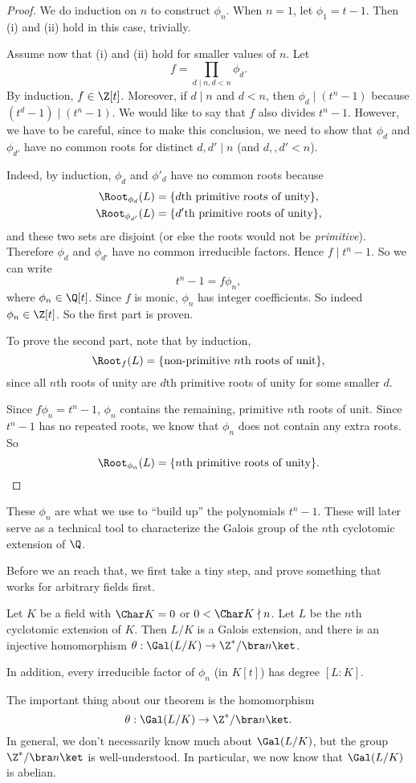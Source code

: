 \documentclass[a4paper]{article}
\begin{document}
\begin{proof}
  We do induction on $n$ to construct $\phi_n$. When $n = 1$, let $\phi_1 = t - 1$. Then (i) and (ii) hold in this case, trivially.

  Assume now that (i) and (ii) hold for smaller values of $n$. Let
  \[
    f = \prod_{d \mid n, d < n} \phi_d.
  \]
  By induction, $f \in \Z[t]$. Moreover, if $d \mid n$ and $d < n$, then $\phi_d \mid (t^n - 1)$ because $(t^d - 1) \mid (t^n - 1)$. We would like to say that $f$ also divides $t^n - 1$. However, we have to be careful, since to make this conclusion, we need to show that $\phi_d$ and $\phi_{d'}$ have no common roots for distinct $d, d' \mid n$ (and $d, ,d' < n$).

  Indeed, by induction, $\phi_d$ and $\phi'_d$ have no common roots because
  \begin{align*}
    \Root_{\phi_d}(L) &= \{d\text{th primitive roots of unity}\},\\
    \Root_{\phi_{d'}}(L) &= \{d'\text{th primitive roots of unity}\},
  \end{align*}
  and these two sets are disjoint (or else the roots would not be \emph{primitive}). Therefore $\phi_d$ and $\phi_{d'}$ have no common irreducible factors. Hence $f \mid t^n - 1$. So we can write
  \[
    t^n - 1 = f \phi_n,
  \]
  where $\phi_n \in \Q[t]$. Since $f$ is monic, $\phi_n$ has integer coefficients. So indeed $\phi_n \in \Z[t]$. So the first part is proven.

  To prove the second part, note that by induction,
  \[
    \Root_f(L) = \{\text{non-primitive }n\text{th roots of unit}\},
  \]
  since all $n$th roots of unity are $d$th primitive roots of unity for some smaller $d$.

  Since $f \phi_n = t^n - 1$, $\phi_n$ contains the remaining, primitive $n$th roots of unit. Since $t^n - 1$ has no repeated roots, we know that $\phi_n$ does not contain any extra roots. So
  \[
    \Root_{\phi_n}(L) = \{n\text{th primitive roots of unity}\}.
  \]
\end{proof}
These $\phi_n$ are what we use to ``build up'' the polynomials $t^n - 1$. These will later serve as a technical tool to characterize the Galois group of the $n$th cyclotomic extension of $\Q$.

Before we an reach that, we first take a tiny step, and prove something that works for arbitrary fields first.

\begin{thm}
  Let $K$ be a field with $\Char K = 0$ or $0 < \Char K \nmid n$. Let $L$ be the $n$th cyclotomic extension of $K$. Then $L/K$ is a Galois extension, and there is an injective homomorphism $\theta: \Gal(L/K) \to \Z^*/\bra n\ket$.

  In addition, every irreducible factor of $\phi_n$ (in $K[t]$) has degree $[L:K]$.
\end{thm}
The important thing about our theorem is the homomorphism
\[
  \theta: \Gal(L/K) \to \Z^*/\bra n\ket.
\]
In general, we don't necessarily know much about $\Gal(L/K)$, but the group $\Z^*/\bra n\ket$ is well-understood. In particular, we now know that $\Gal(L/K)$ is abelian.
\end{document}
